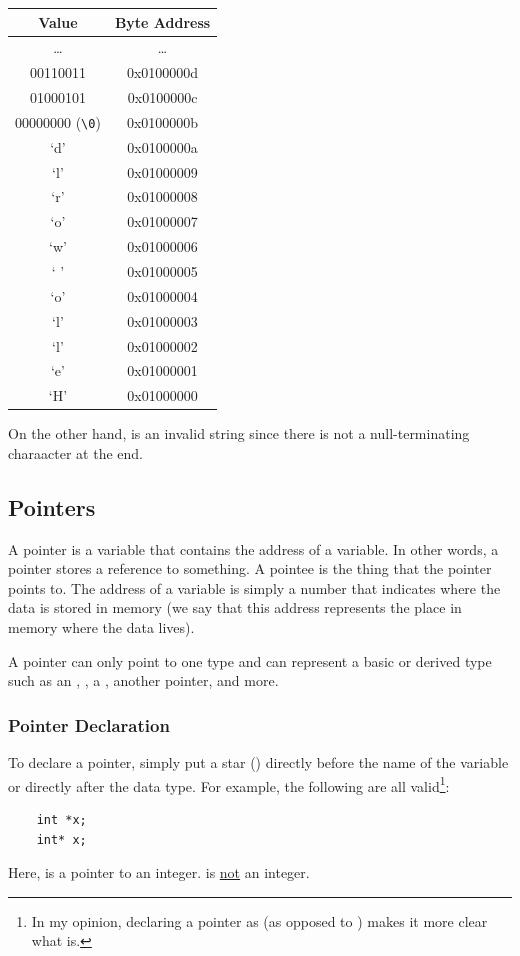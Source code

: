 \documentclass[letterpaper]{article}
\begin{document}
\begin{center}
    \begin{tabular}{c|c}
        \textbf{Value} & \textbf{Byte Address} \\ 
        \hline
        \dots    & \dots      \\
        00110011 & 0x0100000d \\ 
        01000101 & 0x0100000c \\ 
        00000000 (\verb"\0") & 0x0100000b \\ 
        `d'      & 0x0100000a \\ 
        `l'      & 0x01000009 \\ 
        `r'      & 0x01000008 \\ 
        `o'      & 0x01000007 \\ 
        `w'      & 0x01000006 \\ 
        ` '      & 0x01000005 \\ 
        `o'      & 0x01000004 \\ 
        `l'      & 0x01000003 \\ 
        `l'      & 0x01000002 \\ 
        `e'      & 0x01000001 \\ 
        `H'      & 0x01000000
    \end{tabular}
\end{center}

\bigskip 

On the other hand,  is an invalid string since there is not a null-terminating charaacter at the end.

\subsection{Pointers}
A pointer is a variable that contains the address of a variable. In other words, a pointer stores a reference to something. A pointee is the thing that the pointer points to. The address of a variable is simply a number that indicates where the data is stored in memory (we say that this address represents the place in memory where the data lives). 

\bigskip 

A pointer can only point to one type and can represent a basic or derived type such as an , , a , another pointer, and more. 

\subsubsection{Pointer Declaration}
To declare a pointer, simply put a star (\code{*}) directly before the name of the variable or directly after the data type. For example, the following are all valid\footnote{In my opinion, declaring a pointer as  (as opposed to ) makes it more clear what  is.}:
\begin{verbatim}
    int *x; 
    int* x;
\end{verbatim}
Here,  is a pointer to an integer.  is \underline{not} an integer.
\end{document}
